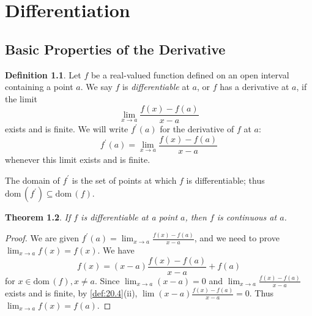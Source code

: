 \documentclass[12pt, lettersize]{book}
\theoremstyle{plain}
\newtheorem{thm}{Theorem}[section]
\theoremstyle{definition}
\newtheorem{dfn}[thm]{Definition}
\theoremstyle{remark}
\newcommand{\dom}{\text{dom}\,}
\begin{document}
	\chapter{Differentiation}
		\newpage
		\section{Basic Properties of the Derivative}
			\begin{dfn}\label{def:28.1}
			Let $f$ be a real-valued function defined on an open interval containing a point $a$. We say $f$ is \emph{differentiable} at $a$, or $f$ has a derivative at $a$, if the limit
			\begin{displaymath}
				\lim_{x\rightarrow a}\frac{f(x)-f(a)}{x-a}
			\end{displaymath}
			exists and is finite. We will write $f^\prime(a)$ for the derivative of $f$ at $a$:
			\begin{displaymath}
				f^\prime(a)=\lim_{x\rightarrow a}\frac{f(x)-f(a)}{x-a}
			\end{displaymath}
			whenever this limit exists and is finite.
			\end{dfn}
			The domain of $f^\prime$ is the set of points at which $f$ is differentiable; thus $\dom(f^\prime)\subseteq\dom(f)$.
			
			\begin{thm}\label{thm:28.2}
			If $f$ is differentiable at a point $a$, then $f$ is continuous at $a$.
			\end{thm}
			\begin{proof}
			We are given $f^\prime(a)=\lim_{x\rightarrow a}\frac{f(x)-f(a)}{x-a}$, and we need to prove $\lim_{x\rightarrow a}f(x)=f(x)$. We have 
			\begin{displaymath}
				f(x)=(x-a)\frac{f(x)-f(a)}{x-a}+f(a)
			\end{displaymath}
			for $x\in\dom(f), x\neq a$. Since $\lim_{x\rightarrow a}(x-a)=0$ and $\lim_{x\rightarrow a}\frac{f(x)-f(a)}{x-a}$ exists and is finite, by \ref{def:20.4}(ii), $\lim (x-a)\frac{f(x)-f(a)}{x-a}=0$. Thus $\lim_{x\rightarrow a}f(x)=f(a)$.
			\end{proof}
			
\end{document}
